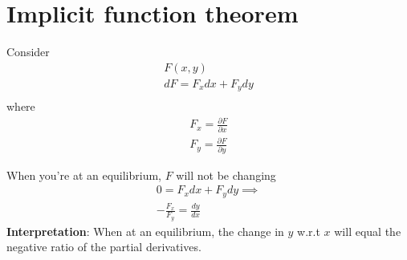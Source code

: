 \documentclass{article}
\begin{document}
\section{Implicit function theorem}
Consider 
\begin{align}
    F(x,y) \\
    d F = F_x dx + F_y dy \\ 
\end{align}
where 
\begin{align}
    F_x = \frac{\partial F}{\partial x} \\
    F_y = \frac{\partial F}{\partial y}
\end{align}

When you're at an equilibrium, $F$ will not be changing 
\begin{align}
    0 = F_x dx + F_y dy \implies \\
    - \frac{F_x}{F_y} = \frac{dy}{dx}
\end{align}
\textbf{Interpretation}: When at an equilibrium, the change in $y$ w.r.t $x$ will equal the negative ratio of the partial derivatives.  
\end{document}
